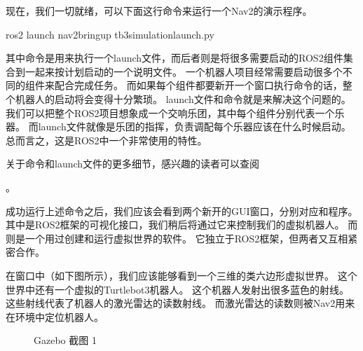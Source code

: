\documentclass[letterpaper,10pt,english]{sphinxmanual}
\begin{document}
\sphinxAtStartPar
现在，我们一切就绪，可以下面这行命令来运行一个Nav2的演示程序。

\begin{sphinxVerbatim}[commandchars=\\\{\}]
ros2 launch nav2\PYGZus{}bringup tb3\PYGZus{}simulation\PYGZus{}launch.py
\end{sphinxVerbatim}

\sphinxAtStartPar
其中命令是用来执行一个launch文件，而后者则是将很多需要启动的ROS2组件集合到一起来按计划启动的一个说明文件。
一个机器人项目经常需要启动很多个不同的组件来配合完成任务。
而如果每个组件都要新开一个窗口执行命令的话，整个机器人的启动将会变得十分繁琐。
launch文件和命令就是来解决这个问题的。
我们可以把整个ROS2项目想象成一个交响乐团，其中每个组件分别代表一个乐器。
而launch文件就像是乐团的指挥，负责调配每个乐器应该在什么时候启动。
总而言之，这是ROS2中一个非常使用的特性。

\sphinxAtStartPar
关于命令和launch文件的更多细节，感兴趣的读者可以查阅%
\begin{footnote}[100]\sphinxAtStartFootnote
{}
%
\end{footnote}。

\sphinxAtStartPar
成功运行上述命令之后，我们应该会看到两个新开的GUI窗口，分别对应和程序。
其中是ROS2框架的可视化接口，我们稍后将通过它来控制我们的虚拟机器人。
而则是一个用过创建和运行虚拟世界的软件。
它独立于ROS2框架，但两者又互相紧密合作。

\sphinxAtStartPar
在窗口中（如下图所示），我们应该能够看到一个三维的类六边形虚拟世界。
这个世界中还有一个虚拟的Turtlebot3机器人。
这个机器人发射出很多蓝色的射线。
这些射线代表了机器人的激光雷达的读数射线。
而激光雷达的读数则被Nav2用来在环境中定位机器人。

\begin{figure}[H]
\centering
\capstart

\noindent{}
\caption{Gazebo 截图 1}\label{\detokenize{chapter_rl_sys/control_code_ex:id4}}\end{figure}
\end{document}
